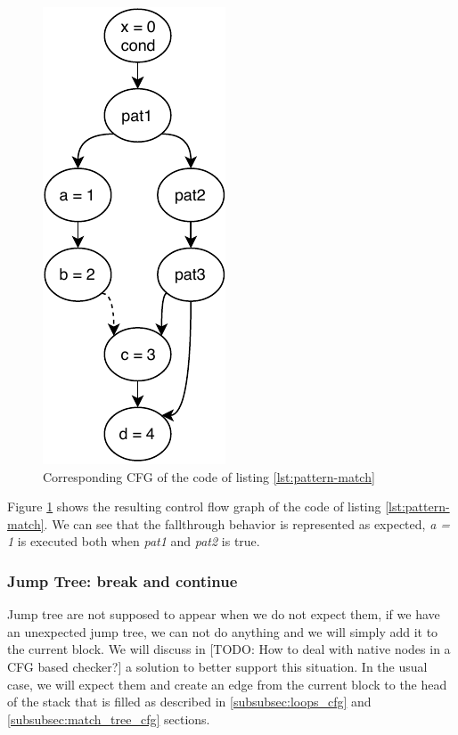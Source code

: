 \begin{figure}[h]
	\caption{Corresponding CFG of the code of listing \ref{lst:pattern-match}}
	\label{figure:pat-mat-cfg}
	\includegraphics[]{figure/pat-mat-cfg.pdf}
\end{figure}



Figure \ref{figure:pat-mat-cfg} shows the resulting control flow graph of the code of listing \ref{lst:pattern-match}. We can see that the fallthrough behavior is represented as expected, \emph{a = 1} is executed both when \emph{pat1} and \emph{pat2} is true.

\subsubsection{Jump Tree: break and continue}
\label{subsubsec:jump_tree_cfg}

Jump tree are not supposed to appear when we do not expect them, if we have an unexpected jump tree, we can not do anything and we will simply add it to the current block. 
We will discuss in [TODO: How to deal with native nodes in a CFG based checker?] a solution to better support this situation.
In the usual case, we will expect them and create an edge from the current block to the head of the stack that is filled as described in \ref{subsubsec:loops_cfg} and \ref{subsubsec:match_tree_cfg} sections.

